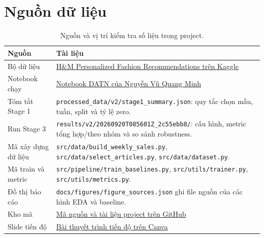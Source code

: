 \documentclass[12pt,a4paper,oneside]{article}
\begin{document}
\section{Nguồn dữ liệu }
\begin{table}[!htbp]
\centering
\small
\caption{Nguồn và vị trí kiểm tra số liệu trong project.}
\begin{tabularx}{\textwidth}{p{}X}
\toprule
Nguồn & Tài liệu \\
\midrule
Bộ dữ liệu & \href{https://www.kaggle.com/competitions/h-and-m-personalized-fashion-recommendations}{H\&M Personalized Fashion Recommendations trên Kaggle} \\
Notebook chạy & \href{https://www.kaggle.com/code/alexnguyen147/datn-notebook}{Notebook DATN của Nguyễn Vũ Quang Minh} \\
Tóm tắt Stage 1 & \texttt{processed\_data/v2/stage1\_summary.json}: quy tắc chọn mẫu, tuần, split và tỷ lệ zero. \\
Run Stage 3 & \texttt{results/v2/20260920T085601Z\_2c55ebb8/}: cấu hình, metric tổng hợp/theo nhóm và so sánh robustness. \\
Mã xây dựng dữ liệu & \texttt{src/data/build\_weekly\_sales.py}, \texttt{src/data/select\_articles.py}, \texttt{src/data/dataset.py}. \\
Mã train và metric & \texttt{src/pipeline/train\_baselines.py}, \texttt{src/utils/trainer.py}, \texttt{src/utils/metrics.py}. \\
Đồ thị báo cáo & \texttt{docs/figures/figure\_sources.json} ghi file nguồn của các hình EDA và baseline. \\
Kho mã & \href{https://github.com/minhquangAlex/DATN-Multimodal-Transformer}{Mã nguồn và tài liệu project trên GitHub} \\
Slide tiến độ & \href{https://www.canva.com/design/DAHXzrrA_dY/iwDhfMl-jzznss1wrkEeXw/edit}{Bài thuyết trình tiến độ trên Canva} \\
\bottomrule
\end{tabularx}
\end{table}
\end{document}
